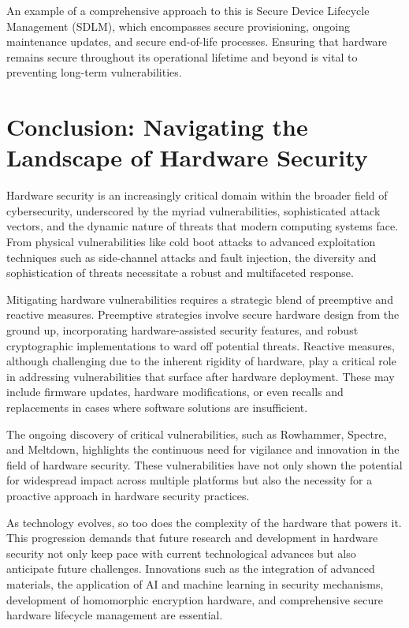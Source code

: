 An example of a comprehensive approach to this is Secure Device Lifecycle Management (SDLM), which encompasses secure provisioning, ongoing maintenance updates, and secure end-of-life processes. Ensuring that hardware remains secure throughout its operational lifetime and beyond is vital to preventing long-term vulnerabilities.

\hypertarget{conclusion}{%
\section{Conclusion: Navigating the Landscape of Hardware Security}\label{conclusion}}

Hardware security is an increasingly critical domain within the broader field of cybersecurity, underscored by the myriad vulnerabilities, sophisticated attack vectors, and the dynamic nature of threats that modern computing systems face. From physical vulnerabilities like cold boot attacks to advanced exploitation techniques such as side-channel attacks and fault injection, the diversity and sophistication of threats necessitate a robust and multifaceted response.

Mitigating hardware vulnerabilities requires a strategic blend of preemptive and reactive measures. Preemptive strategies involve secure hardware design from the ground up, incorporating hardware-assisted security features, and robust cryptographic implementations to ward off potential threats. Reactive measures, although challenging due to the inherent rigidity of hardware, play a critical role in addressing vulnerabilities that surface after hardware deployment. These may include firmware updates, hardware modifications, or even recalls and replacements in cases where software solutions are insufficient.

The ongoing discovery of critical vulnerabilities, such as Rowhammer, Spectre, and Meltdown, highlights the continuous need for vigilance and innovation in the field of hardware security. These vulnerabilities have not only shown the potential for widespread impact across multiple platforms but also the necessity for a proactive approach in hardware security practices.

As technology evolves, so too does the complexity of the hardware that powers it. This progression demands that future research and development in hardware security not only keep pace with current technological advances but also anticipate future challenges. Innovations such as the integration of advanced materials, the application of AI and machine learning in security mechanisms, development of homomorphic encryption hardware, and comprehensive secure hardware lifecycle management are essential.


